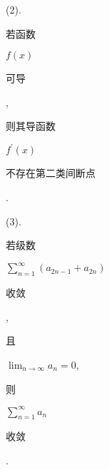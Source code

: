 \documentclass[10pt]{article}
\begin{document}
(2). \begin{CJK}{UTF8}{mj}若函数\end{CJK} $f(x)$ \begin{CJK}{UTF8}{mj}可导\end{CJK}, \begin{CJK}{UTF8}{mj}则其导函数\end{CJK} $f^{\prime}(x)$ \begin{CJK}{UTF8}{mj}不存在第二类间断点\end{CJK}.

(3). \begin{CJK}{UTF8}{mj}若级数\end{CJK} $\sum_{n=1}^{\infty}\left(a_{2 n-1}+a_{2 n}\right)$ \begin{CJK}{UTF8}{mj}收敛\end{CJK}, \begin{CJK}{UTF8}{mj}且\end{CJK} $\lim _{n \rightarrow \infty} a_{n}=0$, \begin{CJK}{UTF8}{mj}则\end{CJK} $\sum_{n=1}^{\infty} a_{n}$ \begin{CJK}{UTF8}{mj}收敛\end{CJK}.
\end{document}
